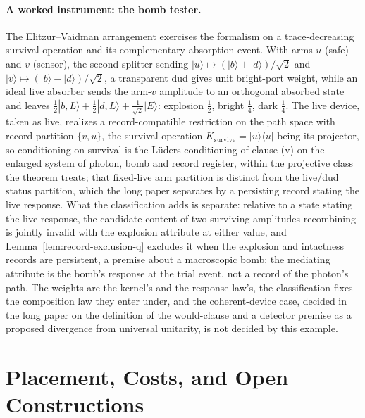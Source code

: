 \paragraph{A worked instrument: the bomb tester.} The Elitzur--Vaidman arrangement \cite{elitzur1993quantum} exercises the formalism on a trace-decreasing survival operation and its complementary absorption event. With arms $u$ (safe) and $v$ (sensor), the second splitter sending $|u\rangle \mapsto (|b\rangle + |d\rangle)/\sqrt 2$ and $|v\rangle \mapsto (|b\rangle - |d\rangle)/\sqrt 2$, a transparent dud gives unit bright-port weight, while an ideal live absorber sends the arm-$v$ amplitude to an orthogonal absorbed state and leaves $\tfrac12|b, L\rangle + \tfrac12|d, L\rangle + \tfrac{1}{\sqrt 2}|E\rangle$: explosion $\tfrac12$, bright $\tfrac14$, dark $\tfrac14$. The live device, taken as live, realizes a record-compatible restriction on the path space with record partition $\{v, u\}$, the survival operation $K_{\mathrm{survive}} = |u\rangle\langle u|$ being its projector, so conditioning on survival is the L\"{u}ders conditioning of clause (v) on the enlarged system of photon, bomb and record register, within the projective class the theorem treats; that fixed-live arm partition is distinct from the live/dud status partition, which the long paper separates by a persisting record stating the live response. What the classification adds is separate: relative to a state stating the live response, the candidate content of two surviving amplitudes recombining is jointly invalid with the explosion attribute at either value, and Lemma~\ref{lem:record-exclusion-q} excludes it when the explosion and intactness records are persistent, a premise about a macroscopic bomb; the mediating attribute is the bomb's response at the trial event, not a record of the photon's path. The weights are the kernel's and the response law's, the classification fixes the composition law they enter under, and the coherent-device case, decided in the long paper on the definition of the would-clause and a detector premise as a proposed divergence from universal unitarity, is not decided by this example.



\section{Placement, Costs, and Open Constructions}\label{sec:discussion}\label{sec:costs}

